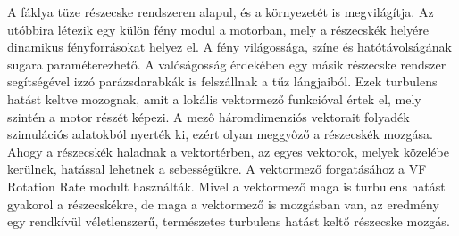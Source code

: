 A fáklya tüze részecske rendszeren alapul, és a környezetét is megvilágítja. Az utóbbira létezik egy külön fény modul a motorban, mely a részecskék helyére dinamikus fényforrásokat helyez el. A fény világossága, színe és hatótávolságának sugara paraméterezhető. A valóságosság érdekében egy másik részecske rendszer segítségével izzó parázsdarabkák is felszállnak a tűz lángjaiból. Ezek turbulens hatást keltve mozognak, amit a lokális vektormező funkcióval értek el, mely szintén a motor részét képezi. A mező háromdimenziós vektorait folyadék szimulációs adatokból nyerték ki, ezért olyan meggyőző a részecskék mozgása. Ahogy a részecskék haladnak a vektortérben, az egyes vektorok, melyek közelébe kerülnek, hatással lehetnek a sebességükre. A vektormező forgatásához a VF Rotation Rate modult használták. Mivel a vektormező maga is turbulens hatást gyakorol a részecskékre, de maga a vektormező is mozgásban van, az eredmény egy rendkívül véletlenszerű, természetes turbulens hatást keltő részecske mozgás. \cite{UEngineFireExample}





